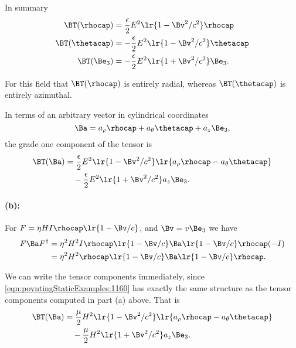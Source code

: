 In summary
\begin{equation}\label{eqn:poyntingStaticExamples:1080}
\begin{aligned}
\BT(\rhocap) &= \frac{\epsilon}{2} E^2 \lr{1 -\Bv^2/c^2} \rhocap \\
\BT(\thetacap) &= -\frac{\epsilon}{2} E^2 \lr{1 -\Bv^2/c^2} \thetacap \\
\BT(\Be_3) &= -\frac{\epsilon}{2} E^2 \lr{1 + \Bv^2/c^2 } \Be_3.
\end{aligned}
\end{equation}

For this field that \( \BT(\rhocap) \) is entirely radial, whereas \( \BT(\thetacap) \) is entirely azimuthal.

In terms of an arbitrary vector in cylindrical coordinates
\begin{equation}\label{eqn:poyntingStaticExamples:1200}
\Ba = a_\rho \rhocap + a_\theta \thetacap + a_z \Be_3,
\end{equation}
the grade one component of the tensor is
\begin{equation}\label{eqn:poyntingStaticExamples:1140}
\begin{aligned}
\BT(\Ba) &=
\frac{\epsilon}{2} E^2 \lr{1 -\Bv^2/c^2} \lr{ a_\rho \rhocap - a_\theta \thetacap } \\
&\quad -\frac{\epsilon}{2} E^2 \lr{1 +\Bv^2/c^2} a_z \Be_3.
\end{aligned}
\end{equation}

\paragraph{(b):}
For \( F = \eta H I \rhocap \lr{ 1 - \Bv/c } \), and \( \Bv = v \Be_3 \) we have
\begin{equation}\label{eqn:poyntingStaticExamples:1160}
\begin{aligned}
F \Ba F^\dagger
&= \eta^2 H^2 I \rhocap \lr{ 1 - \Bv/c } \Ba \lr{ 1 - \Bv/c } \rhocap (-I) \\
&= \eta^2 H^2 \rhocap \lr{ 1 - \Bv/c } \Ba \lr{ 1 - \Bv/c } \rhocap.
\end{aligned}
\end{equation}

We can write the tensor components immediately, since
\cref{eqn:poyntingStaticExamples:1160}
has exactly the same structure as the tensor components computed in part (a) above.  That is
\begin{equation}\label{eqn:poyntingStaticExamples:1180}
\begin{aligned}
\BT(\Ba) &=
\frac{\mu}{2} H^2 \lr{1 -\Bv^2/c^2} \lr{ a_\rho \rhocap - a_\theta \thetacap } \\
&\quad -\frac{\mu}{2} H^2 \lr{1 +\Bv^2/c^2} a_z \Be_3.
\end{aligned}
\end{equation}

